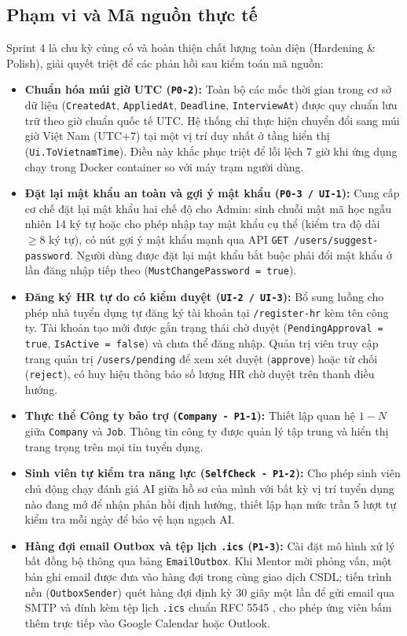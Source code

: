 \subsection{Phạm vi và Mã nguồn thực tế}
Sprint 4 là chu kỳ củng cố và hoàn thiện chất lượng toàn diện (Hardening \& Polish), giải quyết triệt để các phản hồi sau kiểm toán mã nguồn:
\begin{itemize}
    \item \textbf{Chuẩn hóa múi giờ UTC (\texttt{P0-2}):} Toàn bộ các mốc thời gian trong cơ sở dữ liệu (\texttt{CreatedAt}, \texttt{AppliedAt}, \texttt{Deadline}, \texttt{InterviewAt}) được quy chuẩn lưu trữ theo giờ chuẩn quốc tế UTC. Hệ thống chỉ thực hiện chuyển đổi sang múi giờ Việt Nam (UTC+7) tại một vị trí duy nhất ở tầng hiển thị (\texttt{Ui.ToVietnamTime}). Điều này khắc phục triệt để lỗi lệch 7 giờ khi ứng dụng chạy trong Docker container so với máy trạm người dùng.
    \item \textbf{Đặt lại mật khẩu an toàn và gợi ý mật khẩu (\texttt{P0-3 / UI-1}):} Cung cấp cơ chế đặt lại mật khẩu hai chế độ cho Admin: sinh chuỗi mật mã học ngẫu nhiên 14 ký tự hoặc cho phép nhập tay mật khẩu cụ thể (kiểm tra độ dài $\ge 8$ ký tự), có nút gợi ý mật khẩu mạnh qua API \texttt{GET /users/suggest-password}. Người dùng được đặt lại mật khẩu bắt buộc phải đổi mật khẩu ở lần đăng nhập tiếp theo (\texttt{MustChangePassword = true}).
    \item \textbf{Đăng ký HR tự do có kiểm duyệt (\texttt{UI-2 / UI-3}):} Bổ sung luồng cho phép nhà tuyển dụng tự đăng ký tài khoản tại \texttt{/register-hr} kèm tên công ty. Tài khoản tạo mới được gắn trạng thái chờ duyệt (\texttt{PendingApproval = true}, \texttt{IsActive = false}) và chưa thể đăng nhập. Quản trị viên truy cập trang quản trị \texttt{/users/pending} để xem xét duyệt (\texttt{approve}) hoặc từ chối (\texttt{reject}), có huy hiệu thông báo số lượng HR chờ duyệt trên thanh điều hướng.
    \item \textbf{Thực thể Công ty bảo trợ (\texttt{Company - P1-1}):} Thiết lập quan hệ $1-N$ giữa \texttt{Company} và \texttt{Job}. Thông tin công ty được quản lý tập trung và hiển thị trang trọng trên mọi tin tuyển dụng.
    \item \textbf{Sinh viên tự kiểm tra năng lực (\texttt{SelfCheck - P1-2}):} Cho phép sinh viên chủ động chạy đánh giá AI giữa hồ sơ của mình với bất kỳ vị trí tuyển dụng nào đang mở để nhận phản hồi định hướng, thiết lập hạn mức trần 5 lượt tự kiểm tra mỗi ngày để bảo vệ hạn ngạch AI.
    \item \textbf{Hàng đợi email Outbox và tệp lịch \texttt{.ics} (\texttt{P1-3}):} Cài đặt mô hình xử lý bất đồng bộ thông qua bảng \texttt{EmailOutbox}. Khi Mentor mời phỏng vấn, một bản ghi email được đưa vào hàng đợi trong cùng giao dịch CSDL; tiến trình nền (\texttt{OutboxSender}) quét hàng đợi định kỳ 30 giây một lần để gửi email qua SMTP và đính kèm tệp lịch \texttt{.ics} chuẩn RFC 5545 \cite{rfc5545}, cho phép ứng viên bấm thêm trực tiếp vào Google Calendar hoặc Outlook.

\end{itemize}
